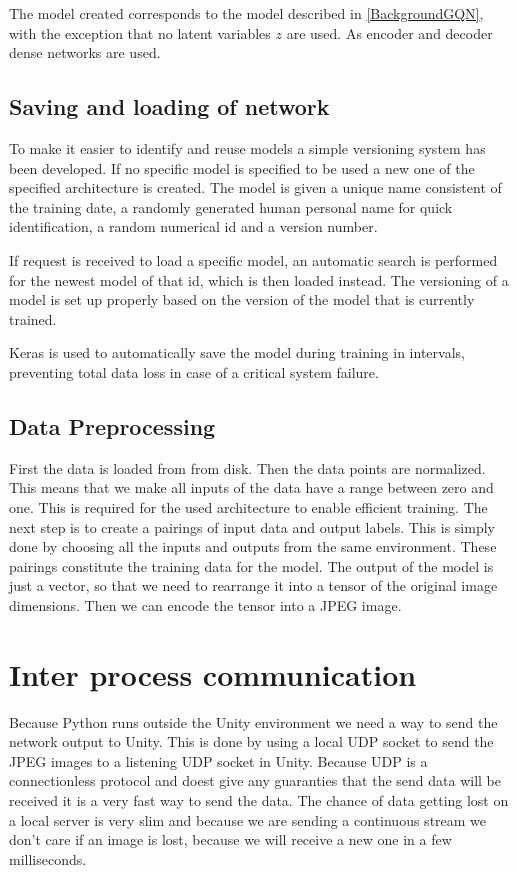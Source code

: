 The model created corresponds to the model described in \cref{BackgroundGQN}, with the exception that no latent variables $z$ are used. As encoder and decoder dense networks are used.



\subsection{Saving and loading of network}
To make it easier to identify and reuse models a simple versioning system has been developed. If no specific model is specified to be used a new one of the specified architecture is created. The model is given a unique name consistent of the training date, a randomly generated human personal name for quick identification, a random numerical id and a version number.

If request is received to load a specific model, an automatic search is performed for the newest model of that id, which is then loaded instead. The versioning of a model is set up properly based on the version of the model that is currently trained.

Keras is used to automatically save the model during training in intervals, preventing total data loss in case of a critical system failure.


\subsection{Data Preprocessing}
First the data is loaded from from disk. Then the data points are normalized. This means that we make all inputs of the data have a range between zero and one. This is required for the used architecture to enable efficient training. The next step is to create a pairings of input data and output labels. This is simply done by choosing all the inputs and outputs from the same environment. These pairings constitute the training data for the model. The output of the model is just a vector, so that we need to rearrange it into a tensor of the original image dimensions. Then we can encode the tensor into a JPEG image.


\section[IPC]{Inter process communication}
Because Python runs outside the Unity environment we need a way to send the network output to Unity. This is done by using a local UDP socket to send the JPEG images to a listening UDP socket in Unity. Because UDP is a connectionless protocol and doest give any guaranties that the send data will be received it is a very fast way to send the data. The chance of data getting lost on a local server is very slim and because we are sending a continuous stream we don't care if an image is lost, because we will receive a new one in a few milliseconds.


